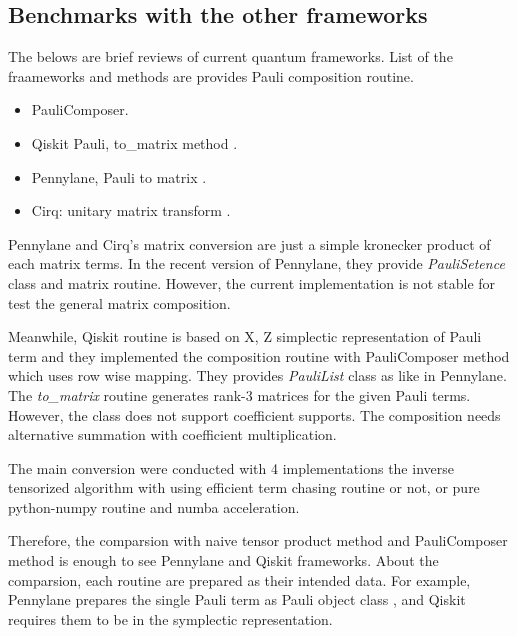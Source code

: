 \documentclass[twocolumn]{article}
\begin{document}
\subsection{Benchmarks with the other frameworks}

The belows are brief reviews of current quantum frameworks.
List of the fraameworks and methods are provides Pauli composition routine.

\begin{itemize}
    \item PauliComposer\cite{vidal_romero_paulicomposer_2023}.
    \item Qiskit Pauli, to\_matrix method \cite{Qiskit}.
    \item Pennylane, Pauli to matrix \cite{bergholm2018pennylane}. %
    \item Cirq: unitary matrix transform \cite{cirq_developers_2023_10247207}. %
\end{itemize}

Pennylane and Cirq's matrix conversion are just a simple kronecker product of each matrix terms.
In the recent version of Pennylane, they provide \textit{PauliSetence} class and matrix routine.
However, the current implementation is not stable for test the general matrix composition.%

Meanwhile, Qiskit routine is based on X, Z simplectic representation of Pauli term 
and they implemented the composition routine with PauliComposer method 
which uses row wise mapping.
They provides \textit{PauliList} class as like in Pennylane. 
The \textit{to\_matrix} routine generates rank-3 matrices for the given Pauli terms.
However, the class does not support coefficient supports. 
The composition needs alternative summation with coefficient multiplication.

The main conversion were conducted with 4 implementations the inverse tensorized algorithm
with using efficient term chasing routine or not, or pure python-numpy routine and numba acceleration.

Therefore, the comparsion with naive tensor product method and PauliComposer method
is enough to see Pennylane and Qiskit frameworks. 
About the comparsion, each routine are prepared as their intended 
data. For example, Pennylane prepares the single Pauli term as Pauli object class
, and Qiskit requires them to be in the symplectic representation.
\end{document}
